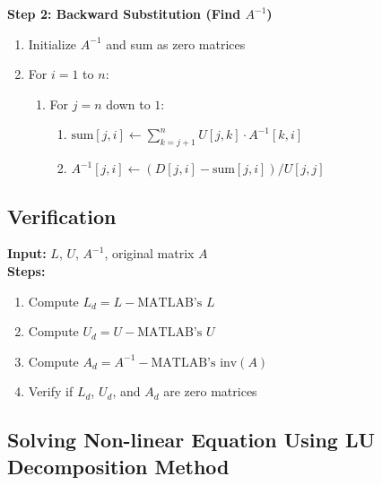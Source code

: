\documentclass[a4paper,12pt]{article}
\begin{document}
\textbf{Step 2: Backward Substitution (Find $A^{-1}$)}
\begin{enumerate}
	\item Initialize $A^{-1}$ and sum as zero matrices
	\item For $i = 1$ to $n$:
	\begin{enumerate}
		\item For $j = n$ down to $1$:
		\begin{enumerate}
			\item $\text{sum}[j,i] \leftarrow \sum_{k=j+1}^{n} U[j,k] \cdot A^{-1}[k,i]$
			\item $A^{-1}[j,i] \leftarrow (D[j,i] - \text{sum}[j,i]) / U[j,j]$
		\end{enumerate}
	\end{enumerate}
\end{enumerate}

\subsection{Verification}
\textbf{Input:} $L$, $U$, $A^{-1}$, original matrix $A$ \\
\textbf{Steps:}
\begin{enumerate}
	\item Compute $L_d = L - \text{MATLAB's } L$
	\item Compute $U_d = U - \text{MATLAB's } U$
	\item Compute $A_d = A^{-1} - \text{MATLAB's } \text{inv}(A)$
	\item Verify if $L_d$, $U_d$, and $A_d$ are zero matrices
\end{enumerate}

	\newpage
	\subsection{Solving Non-linear Equation Using LU Decomposition Method}
	
\end{document}
